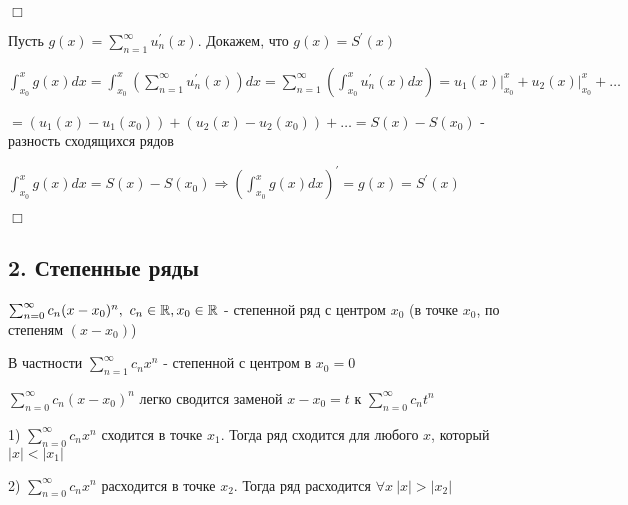 \documentclass[12pt]{article}
\begin{document}
    
    \begin{MyProof}
        $\Box$

        Пусть $g(x) = \sum_{n = 1}^\infty u^\prime_n(x)$. Докажем, что $g(x) = S^\prime(x)$

        $\int_{x_0}^x g(x)dx = \int_{x_0}^x \left(\sum_{n = 1}^\infty u^\prime_n(x)\right) dx = \sum_{n = 1}^\infty 
        \left(\int_{x_0}^x u_n^\prime (x)dx\right) = u_1(x) \Big|_{x_0}^x + u_2(x) \Big|_{x_0}^x + \dots$

        $ = (u_1(x) - u_1(x_0)) + (u_2(x) - u_2(x_0)) + \dots = S(x) - S(x_0)$ - разность сходящихся рядов

        $\int_{x_0}^x g(x) dx = S(x) - S(x_0) \Longrightarrow \left(\int_{x_0}^x g(x) dx\right)^\prime = g(x) = S^\prime(x)$

        $\Box$
    \end{MyProof}

    \subsection{2. Степенные ряды}

    \hypertarget{powerseries}{}

    \Def $\sum_{n = 0}^\infty c_n(x - x_0)^n, \ c_n \in \mathbb{R}, x_0 \in \mathbb{R}$ - степенной ряд с центром $x_0$ (в точке $x_0$, по степеням $(x - x_0)$)

    \Nota В частности $\sum_{n = 1}^\infty c_n x^n$ - степенной с центром в $x_0 = 0$

    $\sum_{n = 0}^\infty c_n(x - x_0)^n$ легко сводится заменой $x - x_0 = t$ к $\sum_{n = 0}^\infty c_n t^n$

    \hypertarget{abelstheorem}{}

    \begin{MyTheorem}

        1) $\sum_{n = 0}^\infty c_n x^n$ сходится в точке $x_1$. Тогда ряд сходится для любого $x$, который $|x| < |x_1|$

        2) $\sum_{n = 0}^\infty c_n x^n$ расходится в точке $x_2$. Тогда ряд расходится $\forall x \ |x| > |x_2|$
    \end{MyTheorem}
\end{document}
